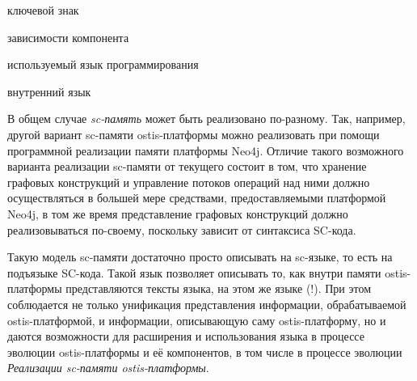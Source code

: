 \begin{SCn}
\begin{scnindent}
	\begin{scnreltolist}{ключевой знак}
	\end{scnreltolist}
    \begin{scnindent}
    \end{scnindent}
\end{scnindent}
\begin{scnrelfromset}{зависимости компонента}
\end{scnrelfromset}
\begin{scnrelfromlist}{используемый язык программирования}
\end{scnrelfromlist}
\begin{scnrelfromlist}{внутренний язык}
\end{scnrelfromlist}
\end{SCn}

В общем случае \textit{sc-память} может быть реализовано по-разному. Так, например, другой вариант sc-памяти ostis-платформы можно реализовать при помощи программной реализации памяти платформы Neo4j. Отличие такого возможного варианта реализации sc-памяти от текущего состоит в том, что хранение графовых конструкций и управление потоков операций над ними должно осуществляться в большей мере средствами, предоставляемыми платформой Neo4j, в том же время представление графовых конструкций должно реализовываться по-своему, поскольку зависит от синтаксиса SC-кода.

Такую модель sc-памяти достаточно просто описывать на sc-языке, то есть на подъязыке SC-кода. Такой язык позволяет описывать то, как внутри памяти ostis-платформы представляются тексты языка, на этом же языке (!). При этом соблюдается не только унификация представления информации, обрабатываемой ostis-платформой, и информации, описывающую саму ostis-платформу, но и даются возможности для расширения и использования языка в процессе эволюции ostis-платформы и её компонентов, в том числе в процессе эволюции \textit{Реализации sc-памяти ostis-платформы}.

